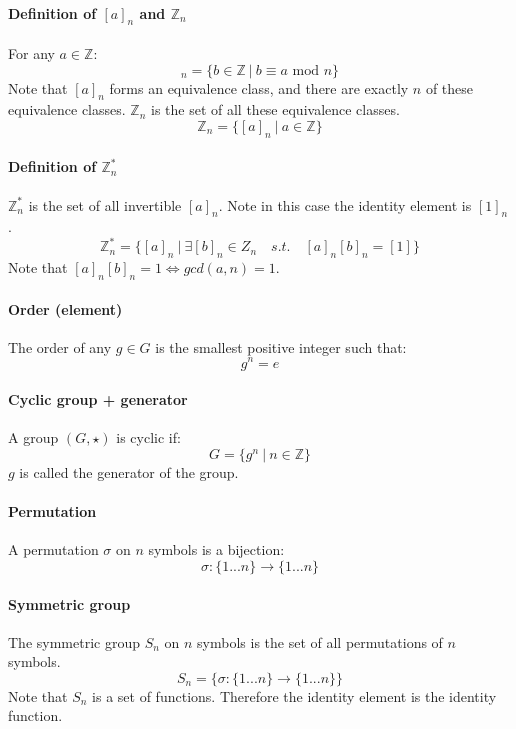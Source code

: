 \documentclass{article}
\newcommand{\Z}{\mathbb{Z}}
\begin{document}
\paragraph{Definition of $ [a]_{n} $ and $ \Z_{n} $}
For any $ a \in \Z $:
\begin{equation}
[a]_{n} = \{b \in \Z \ | \ b \equiv a \textrm{ mod } n \}
\end{equation}
Note that $ [a]_{n} $ forms an equivalence class, and there are exactly $ n $ of these equivalence classes. $ \Z_{n} $ is the set of all these equivalence classes.
\begin{equation}
\Z_{n} = \{[a]_{n} \ | \ a \in \Z \}
\end{equation}
\paragraph{Definition of $ \Z_{n}^{*} $}
$ \Z_{n}^{*} $ is the set of all invertible $ [a]_{n} $. Note in this case the identity element is $ [1]_{n} $.
\begin{equation}
\Z_{n}^{*} = \{[a]_{n} \ | \ \exists [b]_{n} \in Z_{n} \quad s.t. \quad [a]_{n}[b]_{n} = [1]\}
\end{equation}
Note that $ [a]_{n}[b]_{n} = 1 \Leftrightarrow gcd(a, n) = 1 $.
\paragraph{Order (element)}
The order of any $ g \in G $ is the smallest positive integer such that:
\begin{equation}
g^{n} = e
\end{equation}
\paragraph{Cyclic group + generator}
A group $ (G, \star) $ is cyclic if:
\begin{equation}
G = \{ g^{n} \ | \ n \in \Z \} 
\end{equation}
$ g $ is called the generator of the group.
\paragraph{Permutation}
A permutation $ \sigma $ on $ n $ symbols is a bijection:
\begin{equation}
\sigma : \{1...n\} \to \{1...n\}
\end{equation}
\paragraph{Symmetric group}
The symmetric group $ S_{n} $ on $ n $ symbols is the set of all permutations of $ n $ symbols.
\begin{equation}
S_{n} = \{\sigma : \{1...n\} \to \{1...n\}\}
\end{equation}
Note that $ S_{n} $ is a set of functions. Therefore the identity element is the identity function.
\end{document}
